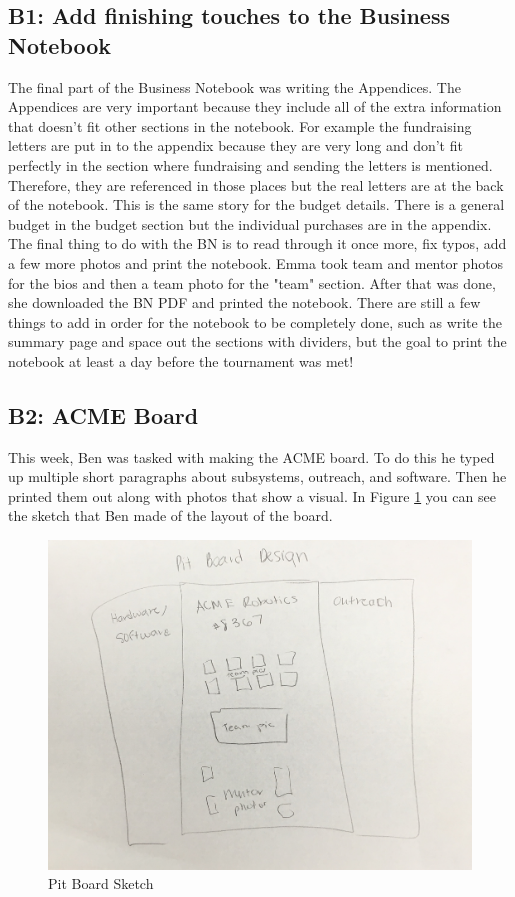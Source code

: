 \documentclass{article}
\begin{document}
\subsection{B1: Add finishing touches to the Business Notebook}

The final part of the Business Notebook was writing the Appendices. The Appendices are very important because they include all of the extra information that doesn't fit other sections in the notebook. For example the fundraising letters are put in to the appendix because they are very long and don't fit perfectly in the section where fundraising and sending the letters is mentioned. Therefore, they are referenced in those places but the real letters are at the back of the notebook. This is the same story for the budget details. There is a general budget in the budget section but the individual purchases are in the appendix. \\
The final thing to do with the BN is to read through it once more, fix typos, add a few more photos and print the notebook. Emma took team and mentor photos for the bios and then a team photo for the "team" section. After that was done, she downloaded the BN PDF and printed the notebook. There are still a few things to add in order for the notebook to be completely done, such as write the summary page and space out the sections with dividers, but the goal to print the notebook at least a day before the tournament was met!

\subsection{B2: ACME Board}

This week, Ben was tasked with making the ACME board. To do this he typed up multiple short paragraphs about subsystems, outreach, and software. Then he printed them out along with photos that show a visual. In Figure \ref{fig:pitboard} you can see the sketch that Ben made of the layout of the board. 

\begin{figure}
    \centering
    \includegraphics[width=.6 \textwidth]{10_11-05/images/pit_board.jpg}
    \caption{Pit Board Sketch}
    \label{fig:pitboard}
\end{figure}
\end{document}
